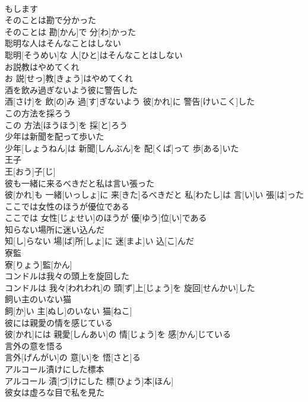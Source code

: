 \documentclass[8pt]{extreport}
\begin{document}
\begin{CJK}{UTF8}{min}
\\	もします
\\	そのことは勘で分かった	
\\	そのことは 勘[かん]で 分[わ]かった
\\	聡明な人はそんなことはしない	
\\	聡明[そうめい]な 人[ひと]はそんなことはしない
\\	お説教はやめてくれ	
\\	お 説[せっ]教[きょう]はやめてくれ
\\	酒を飲み過ぎないよう彼に警告した	
\\	酒[さけ]を 飲[の]み 過[す]ぎないよう 彼[かれ]に 警告[けいこく]した
\\	この方法を採ろう	
\\	この 方法[ほうほう]を 採[と]ろう
\\	少年は新聞を配って歩いた	
\\	少年[しょうねん]は 新聞[しんぶん]を 配[くば]って 歩[ある]いた
\\	王子	
\\	王[おう]子[じ]
\\	彼も一緒に来るべきだと私は言い張った	
\\	彼[かれ]も 一緒[いっしょ]に 来[きた]るべきだと 私[わたし]は 言[い]い 張[は]った
\\	ここでは女性のほうが優位である	
\\	ここでは 女性[じょせい]のほうが 優[ゆう]位[い]である
\\	知らない場所に迷い込んだ	
\\	知[し]らない 場[ば]所[しょ]に 迷[まよ]い 込[こ]んだ
\\	寮監	
\\	寮[りょう]監[かん]
\\	コンドルは我々の頭上を旋回した	
\\	コンドルは 我々[われわれ]の 頭[ず]上[じょう]を 旋回[せんかい]した
\\	飼い主のいない猫	
\\	飼[か]い 主[ぬし]のいない 猫[ねこ]
\\	彼には親愛の情を感じている	
\\	彼[かれ]には 親愛[しんあい]の 情[じょう]を 感[かん]じている
\\	言外の意を悟る	
\\	言外[げんがい]の 意[い]を 悟[さと]る
\\	アルコール漬けにした標本	
\\	アルコール 漬[づ]けにした 標[ひょう]本[ほん]
\\	彼女は虚ろな目で私を見た	

\end{CJK}
\end{document}
